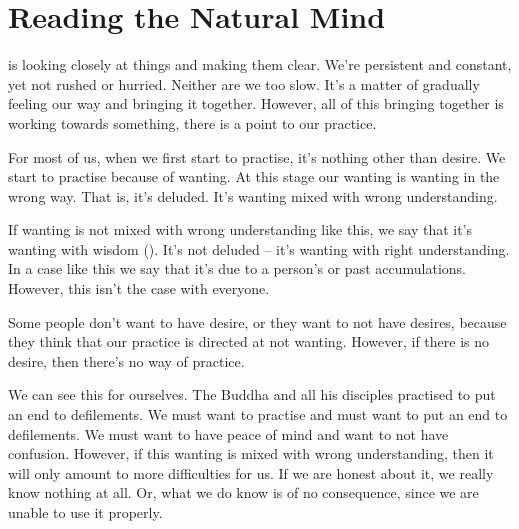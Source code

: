 
\chapter{Reading the Natural Mind}

 is looking closely at things and making them clear. We're persistent and constant, yet not rushed or hurried. Neither are we too slow. It's a matter of gradually feeling our way and bringing it together. However, all of this bringing together is working towards something, there is a point to our practice. 

For most of us, when we first start to practise, it's nothing other than desire. We start to practise because of wanting. At this stage our wanting is wanting in the wrong way. That is, it's deluded. It's wanting mixed with wrong understanding. 

If wanting is not mixed with wrong understanding like this, we say that it's wanting with wisdom (). It's not deluded -- it's wanting with right understanding. In a case like this we say that it's due to a person's  or past accumulations. However, this isn't the case with everyone. 

Some people don't want to have desire, or they want to not have desires, because they think that our practice is directed at not wanting. However, if there is no desire, then there's no way of practice. 

We can see this for ourselves. The Buddha and all his disciples practised to put an end to defilements. We must want to practise and must want to put an end to defilements. We must want to have peace of mind and want to not have confusion. However, if this wanting is mixed with wrong understanding, then it will only amount to more difficulties for us. If we are honest about it, we really know nothing at all. Or, what we do know is of no consequence, since we are unable to use it properly. 

